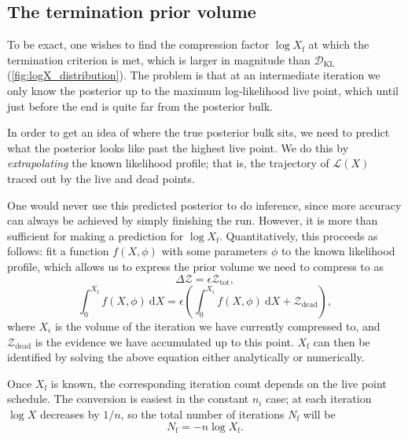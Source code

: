 \documentclass[usenatbib]{mnras}
\newcommand{\nlive}{n_i}
\newcommand{\Like}{\mathcal{L}}
\newcommand{\DKL}{\mathcal{D}_\mathrm{KL}}
\begin{document}
\subsection{The termination prior volume}
To be exact, one wishes to find the compression factor $\log X_ \mathrm{f}$ at which the termination criterion is met, which is larger in magnitude than $\DKL$ (\cref{fig:logX_distribution}). The problem is that at an intermediate iteration we only know the posterior up to the maximum log-likelihood live point, which until just before the end is quite far from the posterior bulk. 
\par
In order to get an idea of where the true posterior bulk sits, we need to predict what the posterior looks like past the highest live point. We do this by \textit{extrapolating} the known likelihood profile; that is, the trajectory of $\Like(X)$ traced out by the live and dead points. 
\par
One would never use this predicted posterior to do inference, since more accuracy can always be achieved by simply finishing the run. However, it is more than sufficient for making a prediction for $\log X_\mathrm{f}$. Quantitatively, this proceeds as follows: fit a function $f(X, \phi)$  with some parameters $\phi$ to the known likelihood profile, which allows us to express the prior volume we need to compress to as
\begin{equation}
	\Delta \mathcal{Z} = \epsilon \mathcal{Z}_\mathrm{tot},
\end{equation}
\begin{equation}\label{endpoint}
	\int_0^{X_\mathrm{f}} f(X, \phi)\ \mathrm{d}X = \epsilon \left( \int_0^{X_i} f(X, \phi)\ \mathrm{d}X + \mathcal{Z}_\mathrm{dead} \right),
\end{equation}
where $X_i$ is the volume of the iteration we have currently compressed to, and $\mathcal{Z}_\mathrm{dead}$ is the evidence we have accumulated up to this point. $X_\mathrm{f}$ can then be identified by solving the above equation either analytically or numerically. 
\par
Once $X_\mathrm{f}$ is known, the corresponding iteration count depends on the live point schedule. The conversion is easiest in the constant $\nlive$ case; at each iteration $\log X$ decreases by $1/n$, so the total number of iterations $N_\mathrm{f}$ will be
\begin{equation}
	N_\mathrm{f} = - n\log X_\mathrm{f} .
\end{equation}
\end{document}
